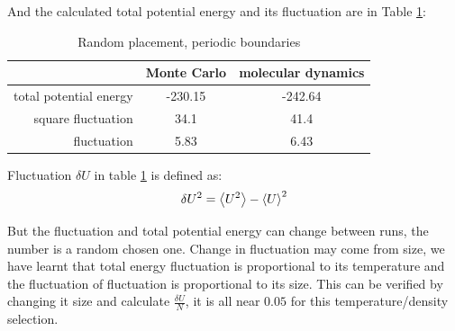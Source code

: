 \documentclass[UTF8,a4paper,no-math]{article}
\begin{document}
And the calculated total potential energy and its fluctuation are in Table \ref{tab:rand1}:
\begin{table}[H]
	\centering
	\caption{Random placement, periodic boundaries}
	\begin{tabular}{rcc}
		\toprule
		\toprule
		                       & Monte Carlo & molecular dynamics \\ \midrule
		total potential energy & -230.15     & -242.64            \\
		square fluctuation     & 34.1        & 41.4               \\
		fluctuation            & 5.83        & 6.43               \\
		\bottomrule
	\end{tabular}%
	\label{tab:rand1}%
\end{table}%
Fluctuation $\delta U$ in table \ref{tab:rand1} is defined as:
\begin{equation}
	\delta U^{2}=\expval{U^2} - \expval{U}^2	\label{eq:flu}
\end{equation}

But the fluctuation and total potential energy can change between runs, the number is a random chosen one. Change in fluctuation may come from size,
we have learnt that total energy fluctuation is proportional to its temperature and the fluctuation of fluctuation is proportional to its size.
This can be verified by changing it size and calculate $\frac{\delta U}{N}$,
it is all near $0.05$ for this temperature/density selection.
\end{document}
